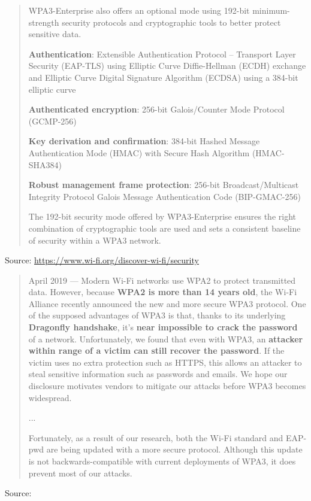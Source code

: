 \documentclass[Screen16to9,17pt]{foils}
\begin{document}

\begin{quote}

WPA3-Enterprise also offers an optional mode using 192-bit minimum-strength security protocols and cryptographic tools to better protect sensitive data.

\begin{list2}
\item {\bf Authentication}: Extensible Authentication Protocol – Transport Layer Security (EAP-TLS) using Elliptic Curve Diffie-Hellman (ECDH) exchange and Elliptic Curve Digital Signature Algorithm (ECDSA) using a 384-bit elliptic curve
\item {\bf Authenticated encryption}: 256-bit Galois/Counter Mode Protocol (GCMP-256)
\item {\bf Key derivation and confirmation}: 384-bit Hashed Message Authentication Mode (HMAC) with Secure Hash Algorithm (HMAC-SHA384)
\item {\bf Robust management frame protection}: 256-bit Broadcast/Multicast Integrity Protocol Galois Message Authentication Code (BIP-GMAC-256)
\end{list2}
The 192-bit security mode offered by WPA3-Enterprise ensures the right combination of cryptographic tools are used and sets a consistent baseline of security within a WPA3 network.
\end{quote}

Source: \url{https://www.wi-fi.org/discover-wi-fi/security}






\begin{quote}\small
April 2019 — Modern Wi-Fi networks use WPA2 to protect transmitted data. However, because {\bf WPA2 is more than 14 years old}, the Wi-Fi Alliance recently announced the new and more secure WPA3 protocol. One of the supposed advantages of WPA3 is that, thanks to its underlying {\bf Dragonfly handshake}, it's {\bf near impossible to crack the password} of a network. Unfortunately, we found that even with WPA3, an {\bf attacker within range of a victim can still recover the password}. If the victim uses no extra protection such as HTTPS, this allows an attacker to steal sensitive information such as passwords and emails. We hope our disclosure motivates vendors to mitigate our attacks before WPA3 becomes widespread.

...

Fortunately, as a result of our research, both the Wi-Fi standard and EAP-pwd are being updated with a more secure protocol. Although this update is not backwards-compatible with current deployments of WPA3, it does prevent most of our attacks.
\end{quote}
Source: 
\end{document}

